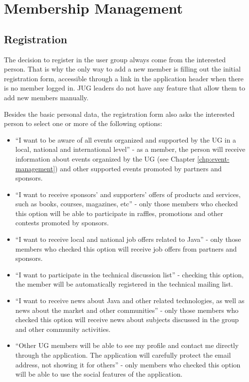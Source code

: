 \documentclass[envcountsame,envcountchap,letterpaper]{svmono}
\begin{document}
\chapter{Membership Management}

\section{Registration}

The decision to register in the user group always come from the interested person. That is why the only way to add a new member is filling out the initial registration form, accessible through a link in the application header when there is no member logged in. JUG leaders do not have any feature that allow them to add new members manually.

Besides the basic personal data, the registration form also asks the interested person to select one or more of the following options:

\begin{itemize}
\item ``I want to be aware of all events organized and supported by the UG in a local, national and international level'' - as a member, the person will receive information about events organized by the UG (see Chapter \ref{chp:event-management}) and other supported events promoted by partners and sponsors.

\item ``I want to receive sponsors' and supporters' offers of products and services, such as books, courses, magazines, etc'' - only those members who checked this option will be able to participate in raffles, promotions and other contests promoted by sponsors.

\item ``I want to receive local and national job offers related to Java'' - only those members who checked this option will receive job offers from partners and sponsors.

\item ``I want to participate in the technical discussion list'' - checking this option, the member will be automatically registered in the technical mailing list.

\item ``I want to receive news about Java and other related technologies, as well as news about the market and other communities'' - only those members who checked this option will receive news about subjects discussed in the group and other community activities.

\item ``Other UG members will be able to see my profile and contact me directly through the application. The application will carefully protect the email address, not showing it for others'' - only members who checked this option will be able to use the social features of the application.
\end{itemize}
\end{document}
